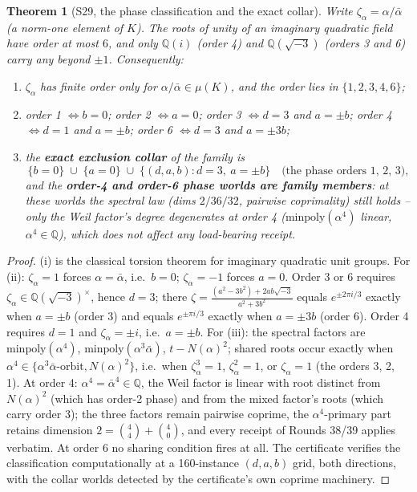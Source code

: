 \documentclass[11pt]{article}
\newtheorem{theorem}{Theorem}[section]
\begin{document}
\begin{theorem}[S29, the phase classification and the exact collar]
\label{thm:s29}
Write $\zeta_\alpha = \alpha/\bar\alpha$ (a norm-one element of $K$).
The roots of unity of an imaginary quadratic field have order at most $6$,
and only $\mathbb{Q}(i)$ (order 4) and $\mathbb{Q}(\sqrt{-3})$ (orders 3
and 6) carry any beyond $\pm 1$. Consequently:
\begin{enumerate}
\item[(i)] $\zeta_\alpha$ has finite order only for
$\alpha/\bar\alpha \in \mu(K)$, and the order lies in
$\{1, 2, 3, 4, 6\}$;
\item[(ii)] order 1 $\iff b = 0$; order 2 $\iff a = 0$;
order 3 $\iff d = 3$ and $a = \pm b$; order 4 $\iff d = 1$ and $a = \pm b$;
order 6 $\iff d = 3$ and $a = \pm 3b$;
\item[(iii)] the \textbf{exact exclusion collar} of the family is
\[
\{b = 0\} \;\cup\; \{a = 0\} \;\cup\; \{(d, a, b) : d = 3,\ a = \pm b\}
\quad\text{(the phase orders 1, 2, 3),}
\]
and the \textbf{order-4 and order-6 phase worlds are family members}: at
these worlds the spectral law (dims $2/36/32$, pairwise coprimality) still
holds -- only the Weil factor's \emph{degree} degenerates at order 4
($\mathrm{minpoly}(\alpha^4)$ linear, $\alpha^4 \in \mathbb{Q}$), which does not
affect any load-bearing receipt.
\end{enumerate}
\end{theorem}

\begin{proof}
(i) is the classical torsion theorem for imaginary quadratic unit groups.
For (ii): $\zeta_\alpha = 1$ forces $\alpha = \bar\alpha$, i.e.\ $b = 0$;
$\zeta_\alpha = -1$ forces $a = 0$. Order 3 or 6 requires
$\zeta_\alpha \in \mathbb{Q}(\sqrt{-3})^\times$, hence $d = 3$; there
$\zeta = \frac{(a^2 - 3b^2) + 2ab\sqrt{-3}}{a^2+3b^2}$ equals
$e^{\pm 2\pi i/3}$ exactly when $a = \pm b$ (order 3) and equals
$e^{\pm \pi i/3}$ exactly when $a = \pm 3b$ (order 6). Order 4 requires
$d = 1$ and $\zeta_\alpha = \pm i$, i.e.\ $a = \pm b$. For (iii): the
spectral factors are $\mathrm{minpoly}(\alpha^4)$, $\mathrm{minpoly}(\alpha^3\bar\alpha)$,
$t - N(\alpha)^2$; shared roots occur exactly when
$\alpha^4 \in \{\alpha^3\bar\alpha\text{-orbit}, N(\alpha)^2\}$, i.e.\
when $\zeta_\alpha^3 = 1$, $\zeta_\alpha^2 = 1$, or $\zeta_\alpha = 1$
(the orders 3, 2, 1). At order 4: $\alpha^4 = \bar\alpha^4 \in
\mathbb{Q}$, the Weil factor is linear with root distinct from
$N(\alpha)^2$ (which has order-2 phase) and from the mixed factor's roots
(which carry order 3); the three factors remain pairwise coprime, the
$\alpha^4$-primary part retains dimension $2 = \binom{4}{4} + \binom{4}{0}$,
and every receipt of Rounds 38/39 applies verbatim. At order 6 no sharing
condition fires at all. The certificate verifies the classification
computationally at a 160-instance $(d, a, b)$ grid, both directions, with
the collar worlds detected by the certificate's own coprime machinery.
\end{proof}
\end{document}
